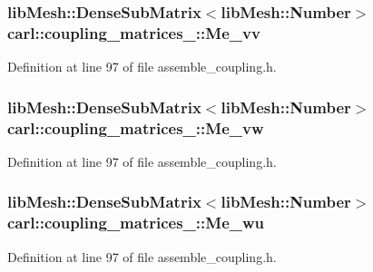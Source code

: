 \hypertarget{classcarl_1_1coupling__matrices__3_af53f357fe4ae7938cefda80a92900bef}{}
\subsubsection[{Me\+\_\+vv}]{\setlength{\rightskip}{0pt plus 5cm}lib\+Mesh\+::\+Dense\+Sub\+Matrix$<$lib\+Mesh\+::\+Number$>$ carl\+::coupling\+\_\+matrices\+\_\+::\+Me\+\_\+vv}\label{classcarl_1_1coupling__matrices__3_af53f357fe4ae7938cefda80a92900bef}


Definition at line 97 of file assemble\+\_\+coupling.\+h.

\hypertarget{classcarl_1_1coupling__matrices__3_a384c93a0e2bfe69a4b908b333e226113}{}
\subsubsection[{Me\+\_\+vw}]{\setlength{\rightskip}{0pt plus 5cm}lib\+Mesh\+::\+Dense\+Sub\+Matrix$<$lib\+Mesh\+::\+Number$>$ carl\+::coupling\+\_\+matrices\+\_\+::\+Me\+\_\+vw}\label{classcarl_1_1coupling__matrices__3_a384c93a0e2bfe69a4b908b333e226113}


Definition at line 97 of file assemble\+\_\+coupling.\+h.

\hypertarget{classcarl_1_1coupling__matrices__3_a3f3132dbd7587e504d12c047c598bc52}{}
\subsubsection[{Me\+\_\+wu}]{\setlength{\rightskip}{0pt plus 5cm}lib\+Mesh\+::\+Dense\+Sub\+Matrix$<$lib\+Mesh\+::\+Number$>$ carl\+::coupling\+\_\+matrices\+\_\+::\+Me\+\_\+wu}\label{classcarl_1_1coupling__matrices__3_a3f3132dbd7587e504d12c047c598bc52}


Definition at line 97 of file assemble\+\_\+coupling.\+h.

\hypertarget{classcarl_1_1coupling__matrices__3_a34a3d938e7ad54997b5d8a227614f983}{}
